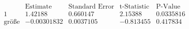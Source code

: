 \[\begin{array}{l|llll}
 \text{} & \text{Estimate} & \text{Standard Error} & \text{t-Statistic} & \text{P-Value} \\
\hline
 1 & 1.42188 & 0.660147 & 2.15388 & 0.0335816 \\
 \text{gr{\" o}{\ss}e} & -0.00301832 & 0.0037105 & -0.813455 & 0.417834 \\
\end{array}\]

